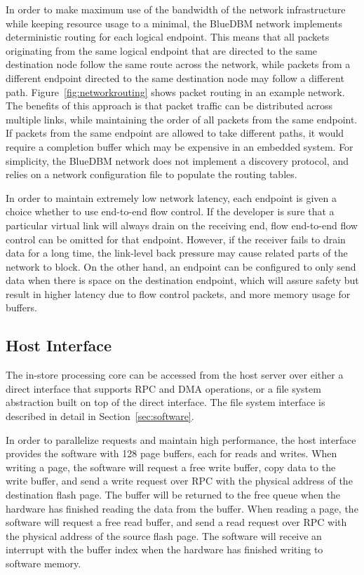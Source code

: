 In order to make maximum use of the bandwidth of the network infrastructure
while keeping resource usage to a minimal, the BlueDBM network implements
deterministic routing for each logical endpoint. This means that all packets
originating from the same logical endpoint that are directed to the same
destination node follow the same route across the network, while packets from a
different endpoint directed to the same destination node may follow a different
path. Figure~\ref{fig:networkrouting} shows packet routing in an example
network. The benefits of this approach is that packet traffic can be distributed
across multiple links, while maintaining the order of all packets from the same
endpoint. If packets from the same endpoint are allowed to take different paths,
it would require a completion buffer which may be expensive in an embedded
system.
For simplicity, the BlueDBM network does not implement a discovery protocol, and relies on a
network configuration file to populate the routing tables. 

In order to maintain extremely low network latency, each endpoint is given a
choice whether to use end-to-end flow control. If the developer is sure
that a particular virtual link will always drain on the receiving end, flow
end-to-end flow control can be omitted for that endpoint. However, if the
receiver fails to drain data for a long time, the link-level back pressure may
cause related parts of the network to block. On the other hand, an endpoint can
be configured to only send data when there is space on the destination endpoint,
which will assure safety but result in higher latency due to flow control
packets, and more memory usage for buffers.

\subsection{Host Interface}

The in-store processing core can be accessed from the host server over either
a direct interface that supports RPC and DMA operations, or a file system
abstraction built on top of the direct interface. The file system interface is
described in detail in Section~\ref{sec:software}.

In order to parallelize requests and maintain high performance, the host
interface provides the software with 128 page buffers, each for reads and
writes. When writing a page, the software will request a free write buffer, copy
data to the write buffer, and send a write request over RPC with the
physical address of the destination flash page.
The buffer will be returned to the free queue when the
hardware has finished reading the data from the buffer. When reading a page, the
software will request a free read buffer, and send a read request over RPC with
the physical address of the source flash page. The software will receive an
interrupt with the buffer index when the hardware has finished writing to
software memory.

